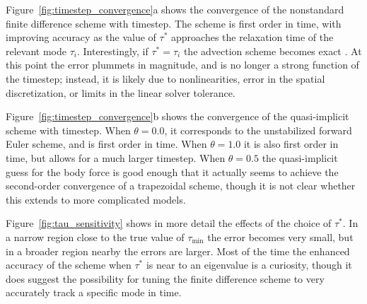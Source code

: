 \documentclass[preprint,12pt,authoryear]{elsarticle}
\begin{document}
Figure~\ref{fig:timestep_convergence}a shows the convergence of the nonstandard finite difference scheme 
with timestep. The scheme is first order in time, with improving accuracy as the value of $\tau^*$ approaches
the relaxation time of the relevant mode $\tau_i$. Interestingly, if $\tau^* = \tau_i$ the advection scheme
becomes exact \citep{mickens2002nonstandard}. At this point the error plummets in magnitude, and is no longer 
a strong function of the timestep; instead, it is likely due to nonlinearities, error in the spatial discretization,
or limits in the linear solver tolerance.

Figure~\ref{fig:timestep_convergence}b shows the convergence of the quasi-implicit scheme with timestep.
When $\theta=0.0$, it corresponds to the unstabilized forward Euler scheme, and is first order in time. 
When $\theta=1.0$ it is also first order in time, but allows for a much larger timestep.  When $\theta=0.5$
the quasi-implicit guess for the body force is good enough that it actually seems to achieve the second-order 
convergence of a trapezoidal scheme, though it is not clear whether this extends to more complicated models.

Figure~\ref{fig:tau_sensitivity} shows in more detail the effects of the choice of $\tau^*$. In a narrow region 
close to the true value of $\tau_\mathrm{min}$ the error becomes very small, but in a broader region nearby 
the errors are larger. Most of the time the enhanced accuracy of the scheme when $\tau^*$ is near to an eigenvalue 
is a curiosity, though it does suggest the possibility for tuning the finite difference scheme to very accurately 
track a specific mode in time.
\end{document}

